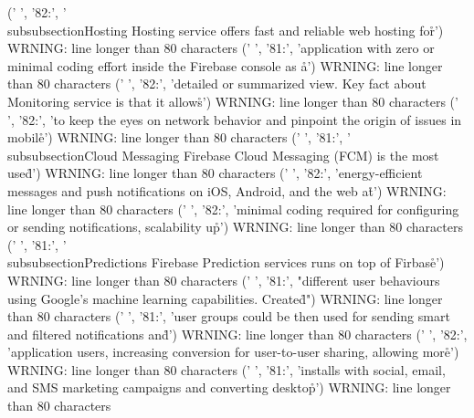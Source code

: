 ('      ', '82:', '\\subsubsection{Hosting} Hosting service offers fast and reliable web hosting for\r\n')
WRNING: line longer than 80 characters
('      ', '81:', 'application with zero or minimal coding effort inside the Firebase console as a\r\n')
WRNING: line longer than 80 characters
('      ', '82:', 'detailed or summarized view. Key fact about Monitoring service is that it allows\r\n')
WRNING: line longer than 80 characters
('      ', '82:', 'to keep the eyes on network behavior and pinpoint the origin of issues in mobile\r\n')
WRNING: line longer than 80 characters
('      ', '81:', '\\subsubsection{Cloud Messaging} Firebase Cloud Messaging (FCM) is the most used\r\n')
WRNING: line longer than 80 characters
('      ', '82:', 'energy-efficient messages and push notifications on iOS, Android, and the web at\r\n')
WRNING: line longer than 80 characters
('      ', '82:', 'minimal coding required for configuring or sending notifications, scalability up\r\n')
WRNING: line longer than 80 characters
('      ', '81:', '\\subsubsection{Predictions} Firebase Prediction services runs on top of Firbase\r\n')
WRNING: line longer than 80 characters
('      ', '81:', "different user behaviours using Google's machine learning capabilities. Created\r\n")
WRNING: line longer than 80 characters
('      ', '81:', 'user groups could be then used for sending smart and filtered notifications and\r\n')
WRNING: line longer than 80 characters
('      ', '82:', 'application users, increasing conversion for user-to-user sharing, allowing more\r\n')
WRNING: line longer than 80 characters
('      ', '81:', 'installs with social, email, and SMS marketing campaigns and converting desktop\r\n')
WRNING: line longer than 80 characters
